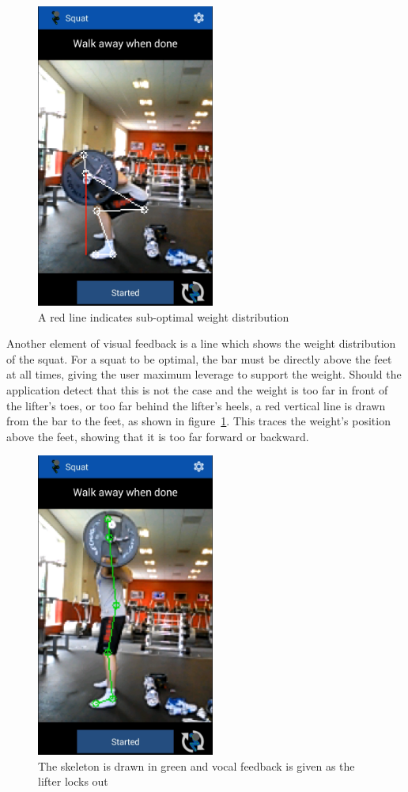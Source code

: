 \begin{figure}[H]
    \centering
	\includegraphics[height=10cm]{application/images/weightdistro}
\caption{A red line indicates sub-optimal weight distribution}
\label{fig:weightdistro}
\end{figure}

Another element of visual feedback is a line which shows the weight distribution of the squat. For a squat to be optimal, the bar must be directly above the feet at all times, giving the user maximum leverage to support the weight. Should the application detect that this is not the case and the weight is too far in front of the lifter's toes, or too far behind the lifter's heels, a red vertical line is drawn from the bar to the feet, as shown in figure~\ref{fig:weightdistro}. This traces the weight's position above the feet, showing that it is too far forward or backward.

\begin{figure}[H]
    \centering
	\includegraphics[height=10cm]{application/images/lockout}
\caption{The skeleton is drawn in green and vocal feedback is given as the lifter locks out}
\label{fig:lockout}
\end{figure}

